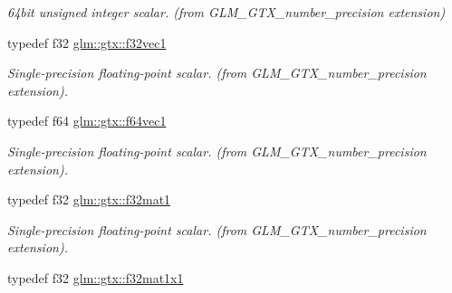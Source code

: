 \begin{CompactItemize}
\begin{CompactList}\small\item\em 64bit unsigned integer scalar. (from GLM\_\-GTX\_\-number\_\-precision extension) \item\end{CompactList}\item 
\hypertarget{group__gtx__number__precision_gdab8e598b0b4697629482682bdb7f223}{
typedef f32 \hyperlink{group__gtx__number__precision_gdab8e598b0b4697629482682bdb7f223}{glm::gtx::f32vec1}}
\label{group__gtx__number__precision_gdab8e598b0b4697629482682bdb7f223}

\begin{CompactList}\small\item\em Single-precision floating-point scalar. (from GLM\_\-GTX\_\-number\_\-precision extension). \item\end{CompactList}\item 
\hypertarget{group__gtx__number__precision_g44336a26c958d66efdfb5a6c114c538e}{
typedef f64 \hyperlink{group__gtx__number__precision_g44336a26c958d66efdfb5a6c114c538e}{glm::gtx::f64vec1}}
\label{group__gtx__number__precision_g44336a26c958d66efdfb5a6c114c538e}

\begin{CompactList}\small\item\em Single-precision floating-point scalar. (from GLM\_\-GTX\_\-number\_\-precision extension). \item\end{CompactList}\item 
\hypertarget{group__gtx__number__precision_ge5ff376ec910c360f06acc0c2b99260c}{
typedef f32 \hyperlink{group__gtx__number__precision_ge5ff376ec910c360f06acc0c2b99260c}{glm::gtx::f32mat1}}
\label{group__gtx__number__precision_ge5ff376ec910c360f06acc0c2b99260c}

\begin{CompactList}\small\item\em Single-precision floating-point scalar. (from GLM\_\-GTX\_\-number\_\-precision extension). \item\end{CompactList}\item 
\hypertarget{group__gtx__number__precision_g01caec78388a82a9a22bd45e5751a38a}{
typedef f32 \hyperlink{group__gtx__number__precision_g01caec78388a82a9a22bd45e5751a38a}{glm::gtx::f32mat1x1}}
\label{group__gtx__number__precision_g01caec78388a82a9a22bd45e5751a38a}


\end{CompactItemize}
